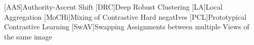\begin{acronym}

    [AAS]{Authority-Ascent Shift}    
    [DRC]{Deep Robust Clustering}
    [LA]{Local Aggregation}
    [MoCHi]{Mixing of Contrastive Hard negatIves}
    [PCL]{Prototypical Contrastive Learning}
    [SwAV]{Swapping Assignments between multiple Views of the same image}

\end{acronym}